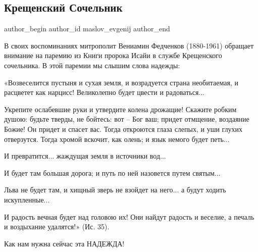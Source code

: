  
 
 
 
 
\subsection{Крещенский Сочельник}
\label{sec:17_01_2021.fb.maslov.1.nadezhda}
\ifcmt
  author_begin
   author_id maslov_evgenij
  author_end
\fi

В своих воспоминаниях митрополит Вениамин Федченков (1880-1961) обращает
внимание на паремию из Книги пророка Исайи в службе Крещенского сочельника. В
этой паремии мы слышим слова надежды:

«Возвеселится пустыня и сухая земля, и возрадуется страна необитаемая, и
расцветет как нарцисс! Великолепно будет цвести и радоваться... 

Укрепите ослабевшие руки и утвердите колена дрожащие! Скажите робким душою:
будьте тверды, не бойтесь: вот – Бог ваш; придет отмщение, воздаяние Божие! Он
придет и спасет вас. Тогда откроются глаза слепых, и уши глухих отверзутся.
Тогда хромой вскочит, как олень; и язык немого будет петь... 

И превратится... жаждущая земля в источники вод... 

И будет там большая дорога; и путь по ней назовется путем святым... 

Льва не будет там, и хищный зверь не взойдет на него... а будут ходить
искупленные... 

И радость вечная будет над головою их! Они найдут радость и веселие, а печаль и
воздыхание удалятся!» (Ис. 35).

Как нам нужна сейчас эта НАДЕЖДА!
